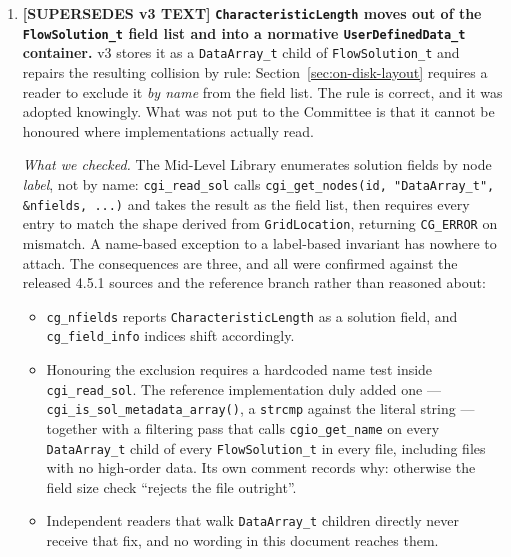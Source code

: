 \documentclass[11pt,letterpaper]{article}
\newif\ifvfourdraft
\newenvironment{v4block}{\ifvfourdraft\color{v4violet}\fi\ignorespaces}{\par}
\newcommand{\SUPERSEDESIV}{\ifvfourdraft
  \textcolor{v4violet}{\textbf{[SUPERSEDES v3 TEXT]}}\else
  \textcolor{clarifybrown}{\textbf{[SUPERSEDES v3 TEXT]}}\fi}
\begin{document}
{\begin{v4block}
\begin{enumerate}[leftmargin=1.4em,itemsep=0.5em]
    \textit{The alternative, for completeness:} leave $\alpha$ free and instead
    withdraw the comparison that \S Lagrange Control Point Distribution mandates,
    removing the ambiguity by removing the requirement.  That costs no writer
    anything, but it also gives up the only check that catches a
    $[0,1]$-versus-$[-1,1]$ simplex convention --- an error
    Section~\ref{sec:coord-conventions} itself describes as undetectable after the
    fact, since such coordinates are indistinguishable from valid ones.  This
    package proposes pinning $\alpha$ because a silently wrong mesh is worse than
    a writer having to change one parameter.

  \item \SUPERSEDESIV{} \textbf{\texttt{CharacteristicLength} moves out of the
    \texttt{FlowSolution\_t} field list and into a normative
    \texttt{UserDefinedData\_t} container.}  v3 stores it as a
    \texttt{DataArray\_t} child of \texttt{FlowSolution\_t} and repairs the
    resulting collision by rule: Section~\ref{sec:on-disk-layout} requires a
    reader to exclude it \emph{by name} from the field list.  The rule is
    correct, and it was adopted knowingly.  What was not put to the Committee is
    that it cannot be honoured where implementations actually read.

    \textit{What we checked.}  The Mid-Level Library enumerates solution fields
    by node \emph{label}, not by name: \texttt{cgi\_read\_sol} calls
    \texttt{cgi\_get\_nodes(id, "DataArray\_t", \&nfields, ...)} and takes the
    result as the field list, then requires every entry to match the shape
    derived from \texttt{GridLocation}, returning \texttt{CG\_ERROR} on
    mismatch.  A name-based exception to a label-based invariant has nowhere to
    attach.  The consequences are three, and all were confirmed against the
    released 4.5.1 sources and the reference branch rather than reasoned about:
    \begin{itemize}[nosep,leftmargin=1.2em]
      \item \texttt{cg\_nfields} reports \texttt{CharacteristicLength} as a
        solution field, and \texttt{cg\_field\_info} indices shift accordingly.
      \item Honouring the exclusion requires a hardcoded name test inside
        \texttt{cgi\_read\_sol}.  The reference implementation duly added one
        --- \texttt{cgi\_is\_sol\_metadata\_array()}, a \texttt{strcmp} against
        the literal string --- together with a filtering pass that calls
        \texttt{cgio\_get\_name} on every \texttt{DataArray\_t} child of every
        \texttt{FlowSolution\_t} in every file, including files with no
        high-order data.  Its own comment records why: otherwise the field size
        check ``rejects the file outright''.
      \item Independent readers that walk \texttt{DataArray\_t} children
        directly never receive that fix, and no wording in this document
        reaches them.
    \end{itemize}


\end{enumerate}
\end{v4block}}
\end{document}
